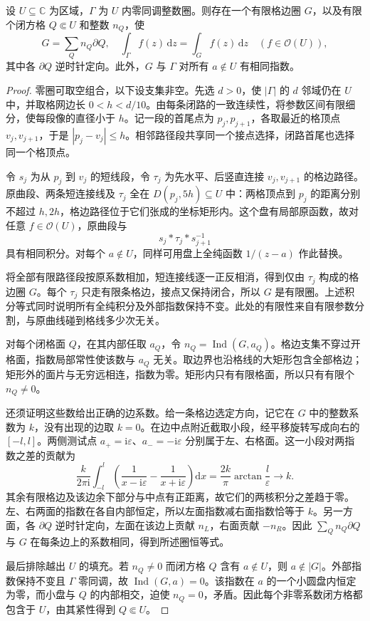 \begin{lemma}[格网分割]\label{b3:lem:10-grid-cycle}
设 \(U\subseteq\mathbb C\) 为区域，\(\Gamma\) 为 \(U\) 内零同调整数圈。则存在一个有限格边圈 \(G\)，以及有限个闭方格 \(Q\Subset U\) 和整数 \(n_Q\)，使
\[
 G=\sum_Q n_Q\partial Q,
 \quad
 \int_\Gamma f(z)\,\mathrm dz=\int_G f(z)\,\mathrm dz
 \quad(f\in\mathcal O(U)),
\]
其中各 \(\partial Q\) 逆时针定向。此外，\(G\) 与 \(\Gamma\) 对所有 \(a\notin U\) 有相同指数。
\end{lemma}
\begin{proof}
零圈可取空组合，以下设支集非空。先选 \(d>0\)，使 \(|\Gamma|\) 的 \(d\) 邻域仍在 \(U\) 中，并取格网边长 \(0<h<d/10\)。由每条闭路的一致连续性，将参数区间有限细分，使每段像的直径小于 \(h\)。记一段的首尾点为 \(p_j,p_{j+1}\)，各取最近的格顶点 \(v_j,v_{j+1}\)，于是 \(|p_j-v_j|\le h\)。相邻路径段共享同一个接点选择，闭路首尾也选择同一个格顶点。

令 \(s_j\) 为从 \(p_j\) 到 \(v_j\) 的短线段，令 \(\tau_j\) 为先水平、后竖直连接 \(v_j,v_{j+1}\) 的格边路径。原曲段、两条短连接线及 \(\tau_j\) 全在 \(D(p_j,5h)\subseteq U\) 中：两格顶点到 \(p_j\) 的距离分别不超过 \(h,2h\)，格边路径位于它们张成的坐标矩形内。这个盘有局部原函数，故对任意 \(f\in\mathcal O(U)\)，原曲段与
\[
 s_j*\tau_j*s_{j+1}^{-1}
\]
具有相同积分。对每个 \(a\notin U\)，同样可用盘上全纯函数 \(1/(z-a)\) 作此替换。

将全部有限路径段按原系数相加，短连接线逐一正反相消，得到仅由 \(\tau_j\) 构成的格边圈 \(G\)。每个 \(\tau_j\) 只走有限条格边，接点又保持闭合，所以 \(G\) 是有限圈。上述积分等式同时说明所有全纯积分及外部指数保持不变。此处的有限性来自有限参数分割，与原曲线碰到格线多少次无关。

对每个闭格面 \(Q\)，在其内部任取 \(a_Q\)，令 \(n_Q=\operatorname{Ind}(G,a_Q)\)。格边支集不穿过开格面，指数局部常性使该数与 \(a_Q\) 无关。取边界也沿格线的大矩形包含全部格边；矩形外的面片与无穷远相连，指数为零。矩形内只有有限格面，所以只有有限个 \(n_Q\ne0\)。

还须证明这些数给出正确的边系数。给一条格边选定方向，记它在 \(G\) 中的整数系数为 \(k\)，没有出现的边取 \(k=0\)。在边中点附近截取小段，经平移旋转写成向右的 \([-l,l]\)。两侧测试点 \(a_+=\mathrm i\varepsilon\)、\(a_-=-\mathrm i\varepsilon\) 分别属于左、右格面。这一小段对两指数之差的贡献为
\[
 \frac{k}{2\pi\mathrm i}\int_{-l}^{l}
 \left(\frac1{x-\mathrm i\varepsilon}-\frac1{x+\mathrm i\varepsilon}\right)\mathrm dx
 =\frac{2k}{\pi}\arctan\frac l\varepsilon
 \longrightarrow k.
\]
其余有限格边及该边余下部分与中点有正距离，故它们的两核积分之差趋于零。左、右两面的指数在各自内部恒定，所以左面指数减右面指数恰等于 \(k\)。另一方面，各 \(\partial Q\) 逆时针定向，左面在该边上贡献 \(n_L\)，右面贡献 \(-n_R\)。因此 \(\sum_Qn_Q\partial Q\) 与 \(G\) 在每条边上的系数相同，得到所述圈恒等式。

最后排除越出 \(U\) 的填充。若 \(n_Q\ne0\) 而闭方格 \(Q\) 含有 \(a\notin U\)，则 \(a\notin|G|\)。外部指数保持不变且 \(\Gamma\) 零同调，故 \(\operatorname{Ind}(G,a)=0\)。该指数在 \(a\) 的一个小圆盘内恒定为零，而小盘与 \(Q\) 的内部相交，迫使 \(n_Q=0\)，矛盾。因此每个非零系数闭方格都包含于 \(U\)，由其紧性得到 \(Q\Subset U\)。
\end{proof}

